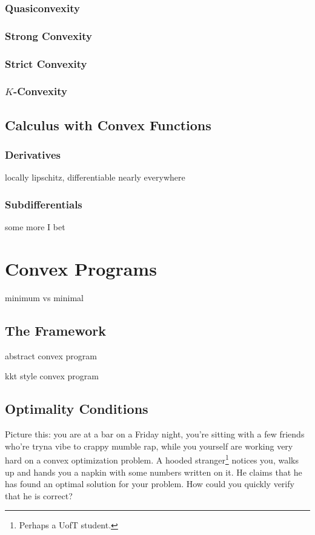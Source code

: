 \documentclass[11pt]{article}
\numberwithin{equation}{section}
\theoremstyle{definition}
\begin{document}
\subsubsection{Quasiconvexity}
\subsubsection{Strong Convexity}
\subsubsection{Strict Convexity}
\subsubsection{$K$-Convexity}

\subsection{Calculus with Convex Functions}
\subsubsection{Derivatives}
locally lipschitz, differentiable nearly everywhere
\subsubsection{Subdifferentials}
some more I bet
\section{Convex Programs}
minimum vs minimal
\subsection{The Framework}
abstract convex program

kkt style convex program
\subsection{Optimality Conditions}
Picture this: you are at a bar on a Friday night, you're sitting with a few friends who're tryna vibe to crappy mumble rap, while you yourself are working very hard on a convex optimization problem. A hooded stranger\footnote{Perhaps a UofT student.} notices you, walks up and hands you a napkin with some numbers written on it. He claims that he has found an optimal solution for your problem. How could you quickly verify that he is correct?
\end{document}
